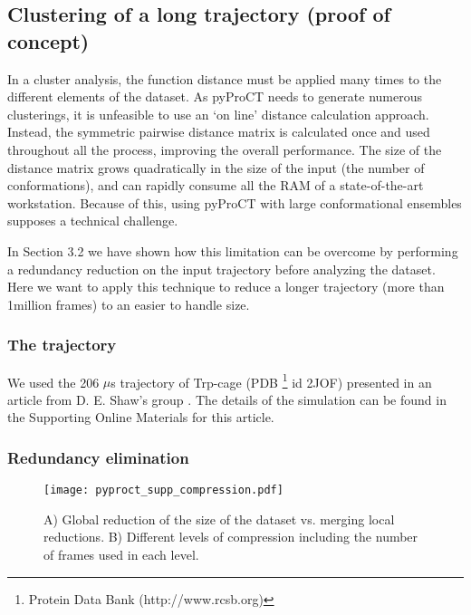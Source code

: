 \subsection{Clustering of a long trajectory (proof of concept)}
\label{sec:pyproct_supp_5}

In a cluster analysis, the function distance must be applied many
times to the different elements of the dataset. As pyProCT needs to
generate numerous clusterings, it is unfeasible to use an `on line'
distance calculation approach. Instead, the symmetric pairwise distance
matrix is calculated once and used throughout all the process, improving
the overall performance. The size of the distance matrix grows quadratically
in the size of the input (the number of conformations), and can rapidly
consume all the RAM of a state-of-the-art workstation. Because of
this, using pyProCT with large conformational ensembles supposes a
technical challenge.

In Section 3.2 we have shown how this limitation can be overcome by
performing a redundancy reduction on the input trajectory before analyzing
the dataset. Here we want to apply this technique to reduce a longer
trajectory (more than 1million frames) to an easier to handle size.


\subsubsection{The trajectory}

We used the 206 $\mu$s trajectory of Trp-cage (PDB%
\footnote{Protein Data Bank (http://www.rcsb.org)%
} id 2JOF) presented in an article from D. E. Shaw's group \cite{kresten_lindorff-larsen1_how_2011}.
The details of the simulation can be found in the Supporting Online
Materials for this article.


\subsubsection{Redundancy elimination}

\begin{figure}
\texttt{[image: pyproct\_supp\_compression.pdf]}

\caption{A) Global reduction of the size of the dataset vs. merging local reductions. B) Different levels of compression including the number of frames used in each level.}
\label{fig:compression}
\end{figure}

